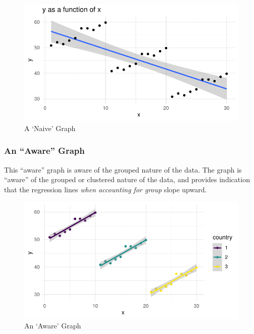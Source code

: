 \documentclass[
  letterpaper,
  DIV=11,
  numbers=noendperiod]{scrreprt}
\begin{document}
\begin{figure}

{\centering \includegraphics{./cross-sectional_files/figure-pdf/fig-naive-1.pdf}

}

\caption{\label{fig-naive}A `Naive' Graph}

\end{figure}

\hypertarget{an-aware-graph}{%
\subsubsection{An ``Aware'' Graph}\label{an-aware-graph}}

This ``aware'' graph is aware of the grouped nature of the data. The
graph is ``aware'' of the grouped or clustered nature of the data, and
provides indication that the regression lines \emph{when accounting for
group} slope upward.

\begin{figure}

{\centering \includegraphics{./cross-sectional_files/figure-pdf/fig-aware-1.pdf}

}

\caption{\label{fig-aware}An `Aware' Graph}

\end{figure}
\end{document}
